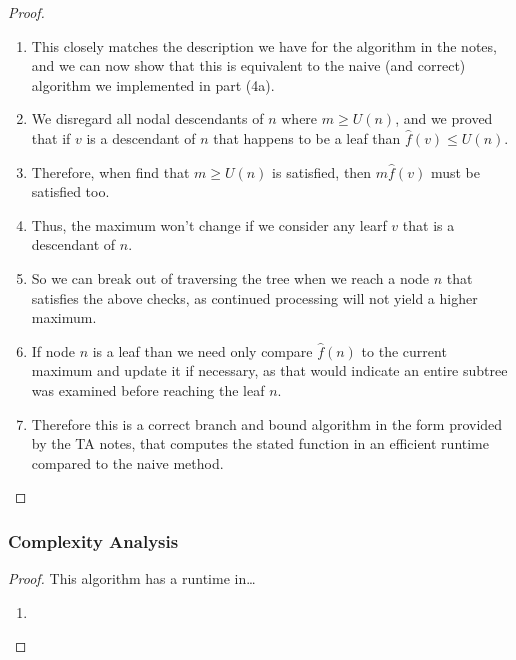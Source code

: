 \documentclass{article}
\begin{document}
\begin{proof}
\begin{enumerate}
            \item This closely matches the description we have for the algorithm in the
                  notes, and we can now show that this is equivalent to the naive (and correct)
                  algorithm we implemented in part (4a).
            \item We disregard all nodal descendants of \(n\) where \(m \geq U(n)\), and
                  we proved that if \(v\) is a descendant of \(n\) that happens to be a leaf
                  than \(\hat{f}(v) \leq U(n)\).
            \item Therefore, when find that \(m \geq U(n)\) is satisfied, then
                  \(m\hat{f}(v)\) must be satisfied too.
            \item Thus, the maximum won't change if we consider any learf \(v\) that is a
                  descendant of \(n\).
            \item So we can break out of traversing the tree when we reach a node \(n\)
                  that satisfies the above checks, as continued processing will not yield
                  a higher maximum.
            \item If node \(n\) is a leaf than we need only compare \(\hat{f}(n)\) to the
                  current maximum and update it if necessary, as that would indicate an
                  entire subtree was examined before reaching the leaf \(n\).
            \item Therefore this is a correct branch and bound algorithm in the form
                  provided by the TA notes, that computes the stated function in an
                  efficient runtime compared to the naive method.
      \end{enumerate}
\end{proof}
\subsubsection{Complexity Analysis}
\begin{proof} This algorithm has a runtime in\dots
      \begin{enumerate}
            \item
      \end{enumerate}
\end{proof}
\end{document}

